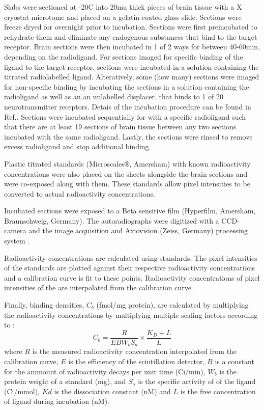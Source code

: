 \documentclass[12pt]{article}
\begin{document}
Slabs were sectioned at -20C into 20mu thick pieces of brain tissue with a X cryostat microtome and placed on a gelatin-coated glass slide. Sections were freeze dryed for overnight prior to incubation. Sections were first preincubated to rehydrate them and eliminate any endogenous substances that bind to the target receptor. Brain sections were then incubated in 1 of 2 ways for between 40-60min, depending on the radioligand. For sections imaged for specific binding of the ligand to the target receptor, sections were incubated in a solution containing the titrated radiolabelled ligand. Alteratively, some (how many) sections were imaged for non-specific binding by  incubating the sections in a solution containing the radioligand as well as an an unlabelled displacer.  that binds to 1 of 20 neurotransmitter receptors. Detais of the incubation procedure can be found in Ref.\cite{Zilles2002quantiative}. Sections were incubated sequentially for with a specific radioligand such that there are at least 19 sections of brain tissue between any two sections incubated with the same radioligand. Lastly, the sections were rinsed to remove excess radioligand and stop additional binding.  

Plastic titrated standards (Microscales®, Amersham) with known radioactivity concentrations were also placed on the sheets alongside the brain sections and were co-exposed along with them. These standards allow pixel intensities to be converted to actual radioactivity concentrations.  

Incubated sections were exposed to a Beta sensitive film (Hyperfilm, Amersham, Braunschweig, Germany).  The autoradiographs were digitized with a CCD-camera and the image acquisition and Axiovision (Zeiss, Germany) processing system .

Radioactivity concentrations are calculated using standards. The pixel intensities of the standards are plotted against their respective radioactivity concentrations and a calibration curve is fit to these points. Radioactivity concentrations of pixel intensities of the are interpolated from the calibration curve.

Finally, binding densities, $C_b$ (fmol/mg protein), are calculated by multiplying the radioactivity concentrations by multiplying multiple scaling factors according to :
            \begin{equation}
                C_b = \frac{R}{ E B W_b S_a} \times \frac{K_D + L}{L}
            \end{equation}
where $R$ is the measured radioactivity concentration interpolated from the calibration curve, $E$ is the efficiency of the scintillation detector, $B$ is a constant for the ammount of radioactivity decays per unit time (Ci/min), $W_b$ is the protein weight of a standard (mg), and $S_a$ is the specific activity of of the ligand (Ci/mmol), $Kd$ is the dissociation constant (nM) and $L$ is the free concentration of ligand during incubation (nM).
\end{document}
